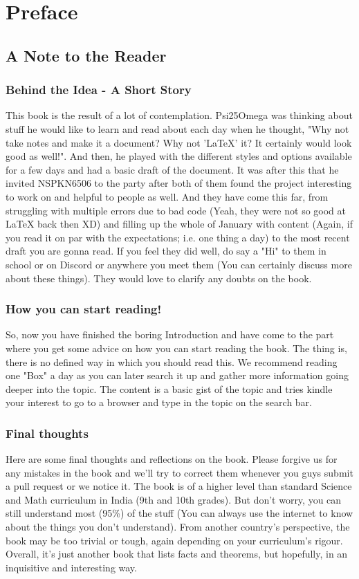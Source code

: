 \section{Preface}
\subsection{A Note to the Reader}
\subsubsection{Behind the Idea - A Short Story}
This book is the result of a lot of contemplation. Psi25Omega was thinking about stuff he would like to learn and read about each day when he thought, "Why not take notes and make it a document? Why not 'LaTeX' it? It certainly would look good as well!". And then, he played with the different styles and options available for a few days and had a basic draft of the document. It was after this that he invited NSPKN6506 to the party after both of them found the project interesting to work on and helpful to people as well. And they have come this far, from struggling with multiple errors due to bad code (Yeah, they were not so good at LaTeX back then XD) and filling up the whole of January with content (Again, if you read it on par with the expectations; i.e. one thing a day) to the most recent draft you are gonna read. If you feel they did well, do say a "Hi" to them in school or on Discord or anywhere you meet them (You can certainly discuss more about these things). They would love to clarify any doubts on the book. 
\subsubsection{How you can start reading!}
So, now you have finished the boring Introduction and have come to the part where you get some advice on how you can start reading the book. The thing is, there is no defined way in which you should read this. We recommend reading one "Box" a day as you can later search it up and gather more information going deeper into the topic. The content is a basic gist of the topic and tries kindle your interest to go to a browser and type in the topic on the search bar.
\subsubsection{Final thoughts}
Here are some final thoughts and reflections on the book. Please forgive us for any mistakes in the book and we'll try to correct them whenever you guys submit a pull request or we notice it. The book is of a higher level than standard Science and Math curriculum in India (9th and 10th grades). But don't worry, you can still understand most (95\%) of the stuff (You can always use the internet to know about the things you don't understand). From another country's perspective, the book may be too trivial or tough, again depending on your curriculum's rigour. Overall, it's just another book that lists facts and theorems, but hopefully, in an inquisitive and interesting way.
